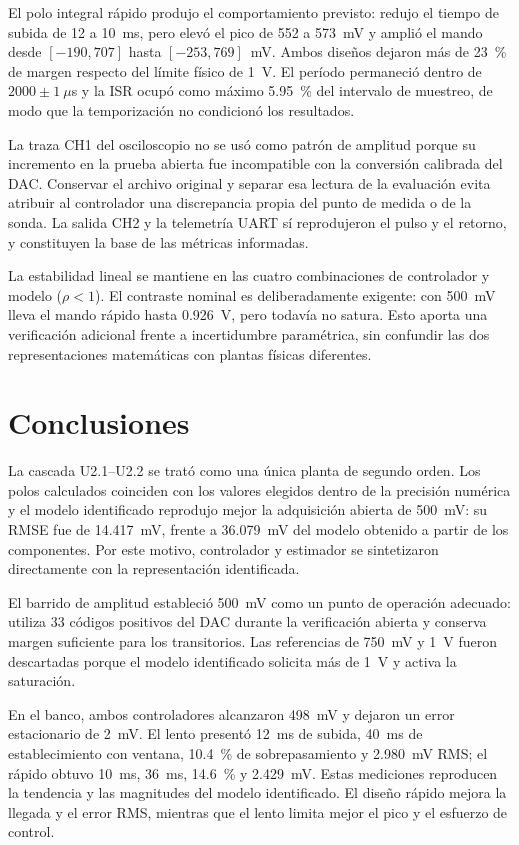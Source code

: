 \documentclass[conference]{IEEEtran}
\begin{document}
El polo integral rápido produjo el comportamiento previsto: redujo el tiempo de subida de 12 a \SI{10}{ms}, pero elevó el pico de 552 a \SI{573}{mV} y amplió el mando desde $[-190,707]$ hasta $[-253,769]$~mV. Ambos diseños dejaron más de \SI{23}{\percent} de margen respecto del límite físico de \SI{1}{V}. El período permaneció dentro de $2000\pm1~\mu$s y la ISR ocupó como máximo \SI{5.95}{\percent} del intervalo de muestreo, de modo que la temporización no condicionó los resultados.

La traza CH1 del osciloscopio no se usó como patrón de amplitud porque su incremento en la prueba abierta fue incompatible con la conversión calibrada del DAC. Conservar el archivo original y separar esa lectura de la evaluación evita atribuir al controlador una discrepancia propia del punto de medida o de la sonda. La salida CH2 y la telemetría UART sí reprodujeron el pulso y el retorno, y constituyen la base de las métricas informadas.

La estabilidad lineal se mantiene en las cuatro combinaciones de controlador y modelo ($\rho<1$). El contraste nominal es deliberadamente exigente: con \SI{500}{mV} lleva el mando rápido hasta \SI{0.926}{V}, pero todavía no satura. Esto aporta una verificación adicional frente a incertidumbre paramétrica, sin confundir las dos representaciones matemáticas con plantas físicas diferentes.

\balance
\section{Conclusiones}
La cascada U2.1--U2.2 se trató como una única planta de segundo orden. Los polos calculados coinciden con los valores elegidos dentro de la precisión numérica y el modelo identificado reprodujo mejor la adquisición abierta de \SI{500}{mV}: su RMSE fue de \SI{14.417}{mV}, frente a \SI{36.079}{mV} del modelo obtenido a partir de los componentes. Por este motivo, controlador y estimador se sintetizaron directamente con la representación identificada.

El barrido de amplitud estableció \SI{500}{mV} como un punto de operación adecuado: utiliza 33 códigos positivos del DAC durante la verificación abierta y conserva margen suficiente para los transitorios. Las referencias de \SI{750}{mV} y \SI{1}{V} fueron descartadas porque el modelo identificado solicita más de \SI{1}{V} y activa la saturación.

En el banco, ambos controladores alcanzaron \SI{498}{mV} y dejaron un error estacionario de \SI{2}{mV}. El lento presentó \SI{12}{ms} de subida, \SI{40}{ms} de establecimiento con ventana, \SI{10.4}{\percent} de sobrepasamiento y \SI{2.980}{mV} RMS; el rápido obtuvo \SI{10}{ms}, \SI{36}{ms}, \SI{14.6}{\percent} y \SI{2.429}{mV}. Estas mediciones reproducen la tendencia y las magnitudes del modelo identificado. El diseño rápido mejora la llegada y el error RMS, mientras que el lento limita mejor el pico y el esfuerzo de control.
\end{document}
